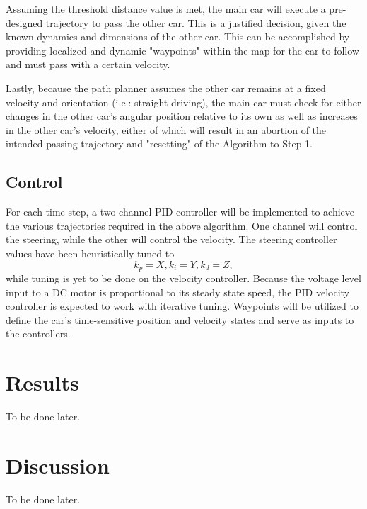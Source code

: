 \documentclass{LTHtwocol} %
\begin{document}
Assuming the threshold distance value is met, the main car will execute a pre-designed trajectory to pass the other car. This is a justified decision, given the known dynamics and dimensions of the other car. This can be accomplished by providing localized and dynamic "waypoints" within the map for the car to follow and must pass with a certain velocity. 

Lastly, because the path planner assumes the other car remains at a fixed velocity and orientation (i.e.: straight driving), the main car must check for either changes in the other car's angular position relative to its own as well as increases in the other car's velocity, either of which will result in an abortion of the intended passing trajectory and "resetting" of the Algorithm to Step 1.

\subsection{Control}
For each time step, a two-channel PID controller will be implemented to achieve the various trajectories required in the above algorithm. One channel will control the steering, while the other will control the velocity. The steering controller values have been heuristically tuned to \textbf{\[k_p = X, k_i = Y, k_d = Z,\]} while tuning is yet to be done on the velocity controller. Because the voltage level input to a DC motor is proportional to its steady state speed, the PID velocity controller is expected to work with iterative tuning. Waypoints will be utilized to define the car's time-sensitive position and velocity states and serve as inputs to the controllers.

\section{Results}
To be done later.
\section{Discussion}
To be done later.



\printbibliography
\end{document}
